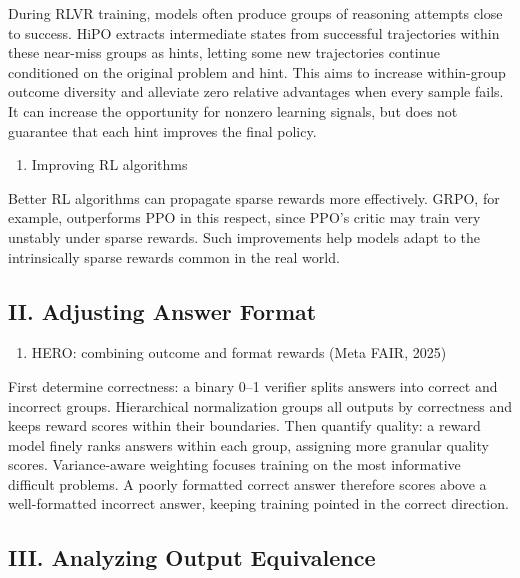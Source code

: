 During RLVR training, models often produce groups of reasoning attempts close to success. HiPO extracts intermediate states from successful trajectories within these near-miss groups as hints, letting some new trajectories continue conditioned on the original problem and hint. This aims to increase within-group outcome diversity and alleviate zero relative advantages when every sample fails. It can increase the opportunity for nonzero learning signals, but does not guarantee that each hint improves the final policy.

\begin{enumerate}
\def\labelenumi{\arabic{enumi}.}
\setcounter{enumi}{4}
\tightlist
\item
  Improving RL algorithms
\end{enumerate}

Better RL algorithms can propagate sparse rewards more effectively. GRPO, for example, outperforms PPO in this respect, since PPO's critic may train very unstably under sparse rewards. Such improvements help models adapt to the intrinsically sparse rewards common in the real world.

\hypertarget{ii.-adjusting-answer-format}{%
\subsection{II. Adjusting Answer Format}\label{ii.-adjusting-answer-format}}

\begin{enumerate}
\def\labelenumi{\arabic{enumi}.}
\tightlist
\item
  HERO: combining outcome and format rewards (Meta FAIR, 2025)
\end{enumerate}

First determine correctness: a binary 0--1 verifier splits answers into correct and incorrect groups. Hierarchical normalization groups all outputs by correctness and keeps reward scores within their boundaries. Then quantify quality: a reward model finely ranks answers within each group, assigning more granular quality scores. Variance-aware weighting focuses training on the most informative difficult problems. A poorly formatted correct answer therefore scores above a well-formatted incorrect answer, keeping training pointed in the correct direction.

\hypertarget{iii.-analyzing-output-equivalence}{%
\subsection{III. Analyzing Output Equivalence}\label{iii.-analyzing-output-equivalence}}

